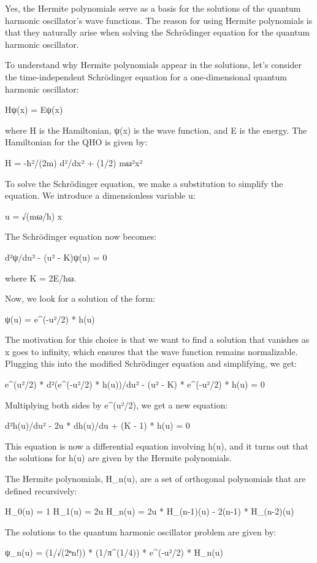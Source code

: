 \documentclass[
]{article}
\begin{document}
Yes, the Hermite polynomials serve as a basis for the solutions of the
quantum harmonic oscillator's wave functions. The reason for using
Hermite polynomials is that they naturally arise when solving the
Schrödinger equation for the quantum harmonic oscillator.

To understand why Hermite polynomials appear in the solutions, let's
consider the time-independent Schrödinger equation for a one-dimensional
quantum harmonic oscillator:

Hψ(x) = Eψ(x)

where H is the Hamiltonian, ψ(x) is the wave function, and E is the
energy. The Hamiltonian for the QHO is given by:

H = -ħ²/(2m) d²/dx² + (1/2) mω²x²

To solve the Schrödinger equation, we make a substitution to simplify
the equation. We introduce a dimensionless variable u:

u = √(mω/ħ) x

The Schrödinger equation now becomes:

d²ψ/du² - (u² - K)ψ(u) = 0

where K = 2E/ħω.

Now, we look for a solution of the form:

ψ(u) = e\^{}(-u²/2) * h(u)

The motivation for this choice is that we want to find a solution that
vanishes as x goes to infinity, which ensures that the wave function
remains normalizable. Plugging this into the modified Schrödinger
equation and simplifying, we get:

e\^{}(u²/2) * d²(e\^{}(-u²/2) * h(u))/du² - (u² - K) * e\^{}(-u²/2) *
h(u) = 0

Multiplying both sides by e\^{}(u²/2), we get a new equation:

d²h(u)/du² - 2u * dh(u)/du + (K - 1) * h(u) = 0

This equation is now a differential equation involving h(u), and it
turns out that the solutions for h(u) are given by the Hermite
polynomials.

The Hermite polynomials, H\_n(u), are a set of orthogonal polynomials
that are defined recursively:

H\_0(u) = 1 H\_1(u) = 2u H\_n(u) = 2u * H\_(n-1)(u) - 2(n-1) *
H\_(n-2)(u)

The solutions to the quantum harmonic oscillator problem are given by:

ψ\_n(u) = (1/√(2ⁿn!)) * (1/π\^{}(1/4)) * e\^{}(-u²/2) * H\_n(u)
\end{document}
